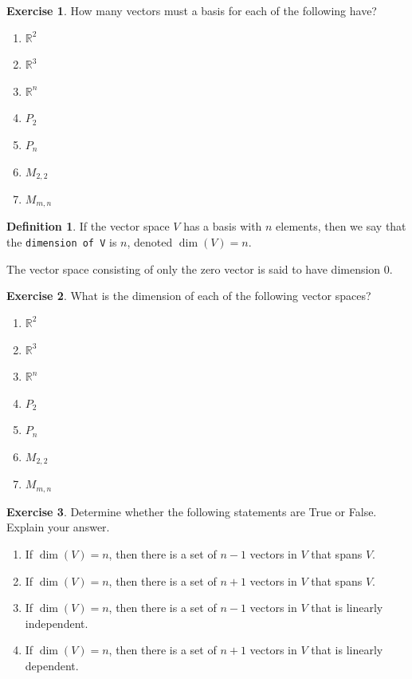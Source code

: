 \documentclass{beamer}
\newcommand{\R}{\mathbb{R}}
\newcommand{\fn}{\insertframenumber}
\theoremstyle{definition}
\newtheorem{exercise}{Exercise}
\newtheorem*{defn}{Definition}
\renewcommand{\emph}[1]{{\color{blue}\texttt{#1}}}
\begin{document}
\begin{frame}{\fn}
	\begin{exercise}
		How many vectors must a basis for each of the following have?
		\begin{enumerate}[label=(\alph*)]
			\item $\R^2$
			\item $\R^3$
			\item $\R^n$
			\item $P_2$
			\item $P_n$
			\item $M_{2,2}$
			\item $M_{m,n}$
		\end{enumerate}
	\end{exercise}
\end{frame}
\begin{frame}{\fn}
	\begin{defn}
		If the vector space $V$ has a basis with $n$ elements, then we say that the \emph{dimension of V} is $n$, denoted $\dim(V)=n$.
		
		The vector space consisting of only the zero vector is said to have dimension 0.
	\end{defn}
\end{frame}
\begin{frame}{\fn}
\begin{exercise}
	What is the dimension of each of the following vector spaces?
	\begin{enumerate}[label=(\alph*)]
		\item $\R^2$
		\item $\R^3$
		\item $\R^n$
		\item $P_2$
		\item $P_n$
		\item $M_{2,2}$
		\item $M_{m,n}$
	\end{enumerate}
\end{exercise}
\end{frame}
\begin{frame}{\fn}
	\begin{exercise}
		Determine whether the following statements are True or False.  Explain your answer.
		\begin{enumerate}[label=(\alph*)]
			\item If $\dim(V)=n$, then there is a set of $n-1$ vectors in $V$ that spans $V$.
			\item If $\dim(V)=n$, then there is a set of $n+1$ vectors in $V$ that spans $V$.
			\item If $\dim(V)=n$, then there is a set of $n-1$ vectors in $V$ that is linearly independent.
			\item If $\dim(V)=n$, then there is a set of $n+1$ vectors in $V$ that is linearly dependent.
		\end{enumerate}
	\end{exercise}
\end{frame}
\end{document}
